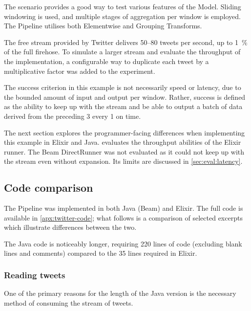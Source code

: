 The scenario provides a good way to test various features of the Model.
Sliding windowing is used, and multiple stages of aggregation per window is employed.
The Pipeline utilises both Elementwise and Grouping Transforms.

The free stream provided by Twitter delivers \num{50}--\num{80} tweets per second, up to \SI{1}{\percent} of the full firehose.
To simulate a larger stream and evaluate the throughput of the implementation, a configurable way to duplicate each tweet by a multiplicative factor was added to the experiment.

The success criterion in this example is not necessarily speed or latency, due to the bounded amount of input and output per window.
Rather, success is defined as the ability to keep up with the stream and be able to output a batch of data derived from the preceding \SI{3}{\min} every \SI{1}{\min} on time.

The next section explores the programmer-facing differences when implementing this example in Elixir and Java.
 evaluates the throughput abilities of the Elixir runner.
The Beam DirectRunner was not evaluated as it could not keep up with the stream even without expansion.
Its limits are discussed in \cref{sec:eval:latency}.

\subsection{Code comparison}\label{sec:eval:twitter:code}

The Pipeline was implemented in both Java (Beam) and Elixir.
The full code is available in \cref{apx:twitter-code}; what follows is a comparison of selected excerpts which illustrate differences between the two.

The Java code is noticeably longer, requiring 220 lines of code (excluding blank lines and comments) compared to the 35 lines required in Elixir.

\subsubsection{Reading tweets}

One of the primary reasons for the length of the Java version is the necessary method of consuming the stream of tweets.

